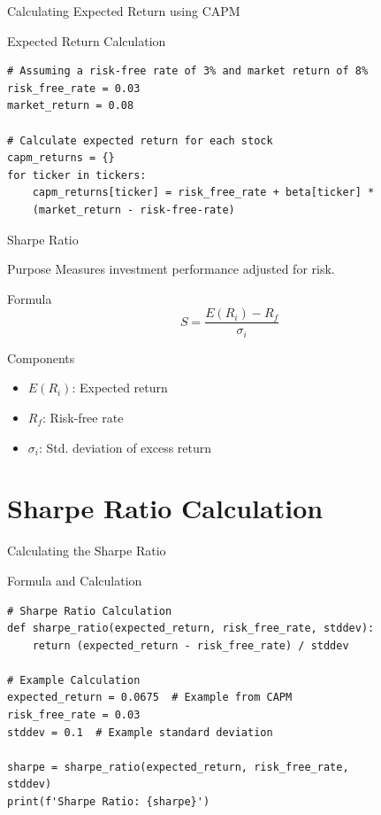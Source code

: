 \documentclass{beamer}
\begin{document}
\begin{frame}[fragile]{Calculating Expected Return using CAPM}
    \begin{block}{Expected Return Calculation}
        \begin{verbatim}
# Assuming a risk-free rate of 3% and market return of 8%
risk_free_rate = 0.03
market_return = 0.08

# Calculate expected return for each stock
capm_returns = {}
for ticker in tickers:
    capm_returns[ticker] = risk_free_rate + beta[ticker] * 
    (market_return - risk-free-rate)
        \end{verbatim}
    \end{block}
\end{frame}

\begin{frame}{Sharpe Ratio}
    \begin{block}{Purpose}
        Measures investment performance adjusted for risk.
    \end{block}
    \begin{block}{Formula}
        \begin{equation*}
            S = \frac{E(R_i) - R_f}{\sigma_i}
        \end{equation*}
    \end{block}
    \begin{block}{Components}
        \begin{itemize}
            \item \(E(R_i)\): Expected return
            \item \(R_f\): Risk-free rate
            \item \(\sigma_i\): Std. deviation of excess return
        \end{itemize}
    \end{block}
\end{frame}

\section{Sharpe Ratio Calculation}
\begin{frame}[fragile]{Calculating the Sharpe Ratio}
    \begin{block}{Formula and Calculation}
        \begin{verbatim}
# Sharpe Ratio Calculation
def sharpe_ratio(expected_return, risk_free_rate, stddev):
    return (expected_return - risk_free_rate) / stddev

# Example Calculation
expected_return = 0.0675  # Example from CAPM
risk_free_rate = 0.03
stddev = 0.1  # Example standard deviation

sharpe = sharpe_ratio(expected_return, risk_free_rate,
stddev)
print(f'Sharpe Ratio: {sharpe}')
        \end{verbatim}
    \end{block}
\end{frame}
\end{document}
